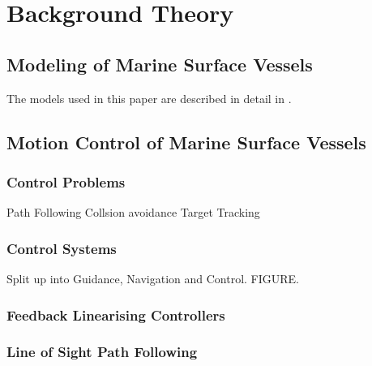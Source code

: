 
\chapter{Background Theory}

\section{Modeling of Marine Surface Vessels}
The models used in this paper are described in detail in \cite{fossen}.

\section{Motion Control of Marine Surface Vessels}
\subsection{Control Problems}
Path Following Collsion avoidance
Target Tracking

\subsection{Control Systems}
Split up into Guidance, Navigation and Control. FIGURE.

\subsection{Feedback Linearising Controllers}

\subsection{Line of Sight Path Following}


\clearpage